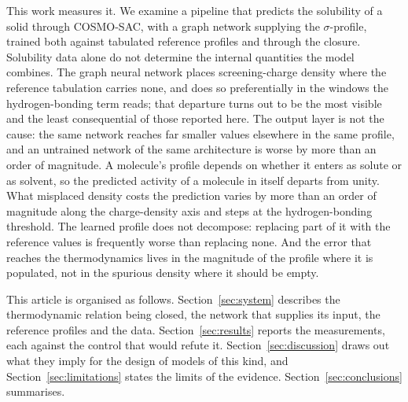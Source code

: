 This work measures it. We examine a pipeline that predicts the solubility of a solid through
COSMO-SAC, with a graph network supplying the $\sigma$-profile, trained both against tabulated
reference profiles and through the closure. Solubility data alone do not determine the internal
quantities the model combines. The graph neural network places screening-charge density where the
reference tabulation carries none, and does so preferentially in the windows the hydrogen-bonding
term reads; that departure turns out to be the most visible and the least consequential of those
reported here. The output layer is not the cause: the same network reaches far smaller values
elsewhere in the same profile, and an untrained network of the same architecture is worse by more
than an order of magnitude. A molecule's profile depends on whether it enters as solute or as
solvent, so the predicted activity of a molecule in itself departs from unity. What misplaced
density costs the prediction varies by more than an order of magnitude along the charge-density
axis and steps at the hydrogen-bonding threshold. The learned profile does not decompose:
replacing part of it with the reference values is frequently worse than replacing none. And the
error that reaches the thermodynamics lives in the magnitude of the profile where it is populated,
not in the spurious density where it should be empty.

This article is organised as follows. Section~\ref{sec:system} describes the thermodynamic
relation being closed, the network that supplies its input, the reference profiles and the data.
Section~\ref{sec:results} reports the measurements, each against the control that would refute it.
Section~\ref{sec:discussion} draws out what they imply for the design of models of this kind, and
Section~\ref{sec:limitations} states the limits of the evidence. Section~\ref{sec:conclusions}
summarises.